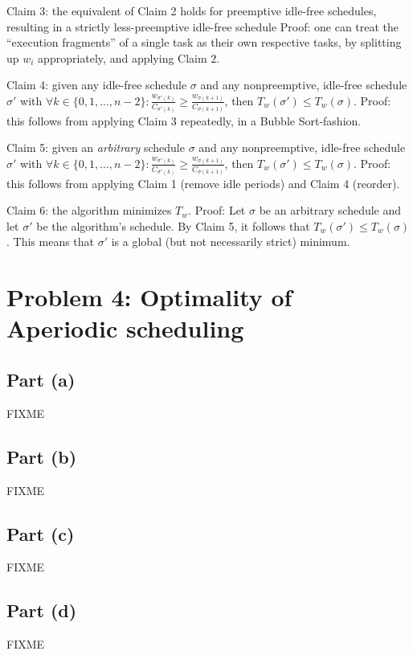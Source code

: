 \documentclass[a4paper,parskip,headheight=38pt]{scrartcl} %
\begin{document}
Claim 3: the equivalent of Claim 2 holds for preemptive idle-free
schedules, resulting in a strictly less-preemptive idle-free schedule
Proof: one can treat the \enquote{execution fragments} of a single task
as their own respective tasks, by splitting up $w_i$ appropriately, and
applying Claim 2.

Claim 4: given any idle-free schedule $\sigma$ and any nonpreemptive,
idle-free schedule $\sigma'$ with $\forall k \in \{0, 1, \ldots, n -
2\}: \frac{w_{\sigma'(k)}}{C_{\sigma'(k)}} \geq \frac{w_{\sigma(k +
1)}}{C_{\sigma(k+1)}}$, then $T_w(\sigma') \leq T_w(\sigma)$.
Proof: this follows from applying Claim 3 repeatedly, in a Bubble
Sort-fashion.

Claim 5: given an \emph{arbitrary} schedule $\sigma$ and any
nonpreemptive, idle-free schedule $\sigma'$ with $\forall k \in \{0, 1,
\ldots, n - 2\}: \frac{w_{\sigma'(k)}}{C_{\sigma'(k)}} \geq
\frac{w_{\sigma(k + 1)}}{C_{\sigma(k+1)}}$, then $T_w(\sigma') \leq
T_w(\sigma)$.
Proof: this follows from applying Claim 1 (remove idle periods) and
Claim 4 (reorder).

Claim 6: the algorithm minimizes $T_w$.
Proof: Let $\sigma$ be an arbitrary schedule and let $\sigma'$ be the
algorithm's schedule.  By Claim 5, it follows that $T_w(\sigma') \leq
T_w(\sigma)$.  This means that $\sigma'$ is a global (but not
necessarily strict) minimum.


\section*{Problem 4: Optimality of Aperiodic scheduling}

\subsection*{Part (a)}

FIXME

\subsection*{Part (b)}

FIXME

\subsection*{Part (c)}

FIXME

\subsection*{Part (d)}

FIXME
\end{document}
